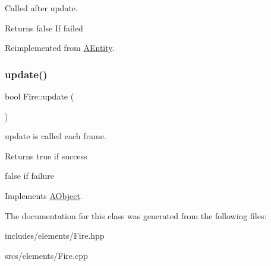 Called after update. 

\begin{DoxyReturn}{Returns}
false If failed 
\end{DoxyReturn}


Reimplemented from \hyperlink{class_a_entity_ae2faa1d11e21033a223fef2bc03b9338}{A\+Entity}.

\mbox{\label{class_fire_a86114cf78108a4b202b75e1f383b3e00}} 
\subsubsection{\texorpdfstring{update()}{update()}}
{\footnotesize\ttfamily bool Fire\+::update (\begin{DoxyParamCaption}{ }\end{DoxyParamCaption})\hspace{0.3cm}{\ttfamily [virtual]}}



update is called each frame. 

\begin{DoxyReturn}{Returns}
true if success 

false if failure 
\end{DoxyReturn}


Implements \hyperlink{class_a_object_af35bb4b68af0a11bb1fcf617bde41ecd}{A\+Object}.



The documentation for this class was generated from the following files\+:\begin{DoxyCompactItemize}
\item 
includes/elements/Fire.\+hpp\item 
srcs/elements/Fire.\+cpp\end{DoxyCompactItemize}
